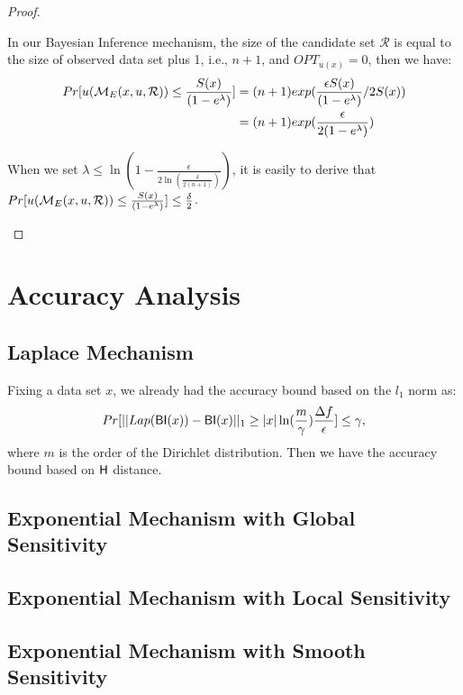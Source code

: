 \begin{proof}
\begin{itemize}
In our Bayesian Inference mechanism, the size of the candidate set $\mathcal{R}$ is equal to the size of observed data set plus 1, i.e., $n + 1$, and $OPT_{u(x)} = 0$, then we have:
\begin{equation*}
\begin{split}
Pr[u(\mathcal{M}_E(x, u, \mathcal{R})) \leq \frac{S(x)}{(1 - e ^ {\lambda})}] 
& = (n + 1)exp(\frac{\epsilon S(x)}{(1 - e ^ {\lambda})}/2 S(x))\\
& = (n + 1)exp(\frac{\epsilon}{2 (1 - e ^ {\lambda})})\\
\end{split}
\end{equation*}

When we set $\lambda \leq \ln(1 - \frac{\epsilon}{2 \ln (\frac{\delta}{2 (n + 1)})})$, it is easily to derive that $Pr[u(\mathcal{M}_E(x, u, \mathcal{R})) \leq \frac{S(x)}{(1 - e ^ {\lambda})}] \leq \frac{\delta}{2}$.

\end{itemize}

\end{proof}

\section{Accuracy Analysis}
\subsection{Laplace Mechanism}
Fixing a data set $x$, we already had the accuracy bound based on the $l_1$ norm as:
\begin{equation*}
Pr[||Lap(\mathsf{BI}(x)) - \mathsf{BI}(x)||_1 \geq |x| \ln (\frac{m}{\gamma}) \frac{\Delta f}{\epsilon}] \leq \gamma,
\end{equation*}
where $m$ is the order of the Dirichlet distribution. Then we have the accuracy bound based on $\mathsf{H}$ distance.


\subsection{Exponential Mechanism with Global Sensitivity}


\subsection{Exponential Mechanism with Local Sensitivity}


\subsection{Exponential Mechanism with Smooth Sensitivity}


